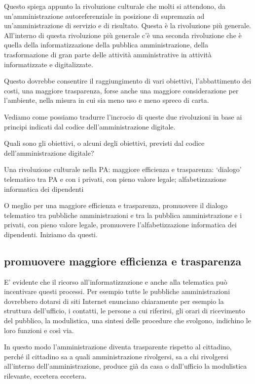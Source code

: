 Questo spiega appunto la rivoluzione culturale che molti si attendono, da un'amministrazione autoreferenziale in posizione di supremazia ad un'amministrazione di servizio e di risultato.
Questa è la rivoluzione più generale. All'interno di questa rivoluzione più generale c'è una seconda rivoluzione che è quella della informatizzazione della pubblica amministrazione, della trasformazione di gran parte delle attività amministrative in attività informatizzate e digitalizzate. 

Questo dovrebbe consentire il raggiungimento di vari obiettivi, l'abbattimento dei costi, una maggiore trasparenza, forse anche una maggiore considerazione per l'ambiente, nella misura in cui sia meno uso e meno spreco di carta. 

Vediamo come possiamo tradurre l'incrocio di queste due rivoluzioni in base ai principi indicati dal codice dell'amministrazione digitale.

Quali sono gli obiettivi, o alcuni degli obiettivi, previsti dal codice dell'amministrazione digitale? 

Una rivoluzione culturale nella PA: maggiore efficienza e trasparenza: ‘dialogo’ telematico tra PA e con i privati, con pieno valore legale; alfabetizzazione informatica dei dipendenti
\par

O meglio per una maggiore efficienza e trasparenza, promuovere il dialogo telematico tra pubbliche amministrazioni e tra la pubblica amministrazione e i privati, con pieno valore legale, promuovere l'alfabetizzazione informatica dei dipendenti. 
Iniziamo da questi. 
\subsection{promuovere maggiore efficienza e trasparenza}
E' evidente che il ricorso all'informatizzazione e anche alla telematica può incentivare questi processi. Per esempio tutte le pubbliche amministrazioni dovrebbero dotarsi di siti Internet enunciano chiaramente per esempio la struttura dell'ufficio, i contatti, le persone a cui riferirsi, gli orari di ricevimento del pubblico, la modulistica, una sintesi delle procedure che svolgono, indichino le loro funzioni e così via.

In questo modo l'amministrazione diventa trasparente rispetto al cittadino, perché il cittadino sa a quali amministrazione rivolgersi, sa a chi rivolgersi all'interno dell'amministrazione, produce già da casa o dall'ufficio la modulistica rilevante, eccetera eccetera.

